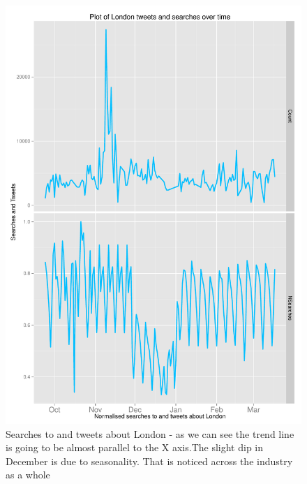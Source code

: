 \documentclass[minf,twoside,singlespacing,parskip,frontabs]{infthesis}
\begin{document}
\begin{figure}[]
\begin{center}
\includegraphics[scale=0.7]{london-searches}
\end{center}
\caption{Searches to and tweets about London - as we can see the trend line  is going to be almost parallel to the X axis.The slight dip in December is due to seasonality. That is noticed across the industry as a whole}
\label{london-searches}
\end{figure}
\end{document}
